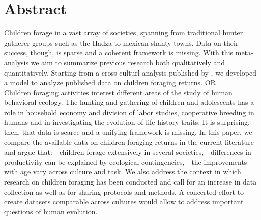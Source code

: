 \section{Abstract}
Children forage in a vast array of societies, spanning from traditional hunter gatherer groups such as the Hadza to mexican shanty towns. Data on their success, though, is sparse and a coherent framework is missing. With this meta-analysis we aim to summarize previous research both qualitatively and quantitatively. Starting from a cross culturl analysis published by \cite{koster_life_2019}, we developed a model to analyze published data on children foraging returns. 
OR\\
Children foraging activities interest different areas of the study of human behavioral ecology. The hunting and gathering of children and adolescents has a role in household economy and division of labor studies, cooperative breeding in humans and in investigating the evolution of life history traits. It is surprising, then, that data is scarce and a unifying framework is missing. In this paper, we compare the available data on children foraging returns in the current literature and argue that: - children forage extensively in several societies, - differences in productivity can be explained by ecological contingencies, - the improvements with age vary across culture and task. We also address the context in which research on children foraging has been conducted and call for an increase in data collection as well as for sharing protocols and methods. A concerted effort to create datasets comparable across cultures would allow to address important questions of human evolution.

